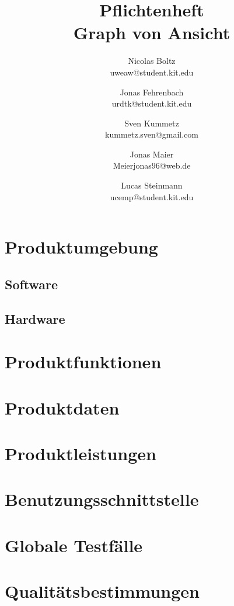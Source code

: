 \documentclass[a4paper]{scrreprt}
\begin{document}
\title{Pflichtenheft\\
Graph von Ansicht}
\date{}
\author{Nicolas Boltz   \\ uweaw@student.kit.edu
  \and Jonas Fehrenbach \\ urdtk@student.kit.edu
  \and Sven Kummetz     \\ kummetz.sven@gmail.com
  \and Jonas Maier      \\ Meierjonas96@web.de
  \and Lucas Steinmann  \\ ucemp@student.kit.edu
}
\maketitle


\tableofcontents





\chapter{Produktumgebung}

\section{Software}

\section{Hardware}

\chapter{Produktfunktionen}

\chapter{Produktdaten}

\chapter{Produktleistungen}

\chapter{Benutzungsschnittstelle}

\chapter{Globale Testfälle}

\chapter{Qualitätsbestimmungen}

\begin{appendices}
\end{appendices}

\listoffigures
\end{document}

